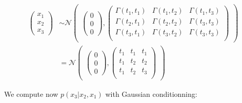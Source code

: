 \begin{align}
    \begin{pmatrix}
        x_1 \\ x_2 \\ x_3
    \end{pmatrix} &\sim 
    \mathcal{N}
    \begin{pmatrix}
        \begin{pmatrix}
            0 \\ 0 \\ 0
        \end{pmatrix},
        \begin{pmatrix}
            \Gamma(t_1,t_1) & \Gamma(t_1,t_2) & \Gamma(t_1, t_3) \\
            \Gamma(t_2,t_1) & \Gamma(t_2,t_2) & \Gamma(t_3, t_3) \\
            \Gamma(t_3,t_1) & \Gamma(t_3,t_2) & \Gamma(t_3, t_3) \\
        \end{pmatrix}
    \end{pmatrix} \\
    &= \mathcal{N}
    \begin{pmatrix}
        \begin{pmatrix}
            0 \\ 0 \\ 0
        \end{pmatrix},
        \begin{pmatrix}
            t_1 & t_1 & t_1 \\
            t_1 & t_2 & t_2 \\
            t_1 & t_2 & t_3 \\
        \end{pmatrix}
    \end{pmatrix}
\end{align}

We compute now $p(x_3 \vert x_2, x_1)$ with Gaussian conditionning:

